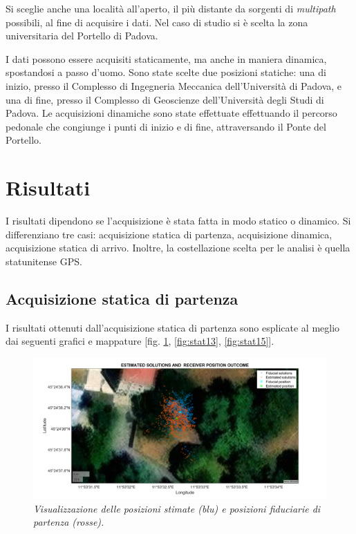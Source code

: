 \documentclass[a4paper,11pt,twoside]{book}
\begin{document}
	Si sceglie anche una località all'aperto, il più distante da sorgenti di \textit{multipath} possibili, al fine di acquisire i dati. Nel caso di studio si è scelta la zona universitaria del Portello di Padova.
	
	I dati possono essere acquisiti staticamente, ma anche in maniera dinamica, spostandosi a passo d'uomo. Sono state scelte due posizioni statiche: una di inizio, presso il Complesso di Ingegneria Meccanica dell'Università di Padova, e una di fine, presso il Complesso di Geoscienze dell'Università degli Studi di Padova. Le acquisizioni dinamiche sono state effettuate effettuando il percorso pedonale che congiunge i punti di inizio e di fine, attraversando il Ponte del Portello.
	
	\section{Risultati}
	
	I risultati dipendono se l'acquisizione è stata fatta in modo statico o dinamico. Si differenziano tre casi: acquisizione statica di partenza, acquisizione dinamica, acquisizione statica di arrivo. Inoltre, la costellazione scelta per le analisi è quella statunitense GPS.
	
	\subsection{Acquisizione statica di partenza}
	
	I risultati ottenuti dall'acquisizione statica di partenza sono esplicate al meglio dai seguenti grafici e mappature [fig. \ref{fig:stat12}, \ref{fig:stat13}, \ref{fig:stat15}].
	
	\begin{figure}[H]
		\centering
		\includegraphics[scale=0.30]{"Immagini workbook/Immagini esp3/stat12"}
		\caption{\textit{Visualizzazione delle posizioni stimate (blu) e posizioni fiduciarie di partenza (rosse).}}
		\label{fig:stat12}
	\end{figure}
\end{document}
